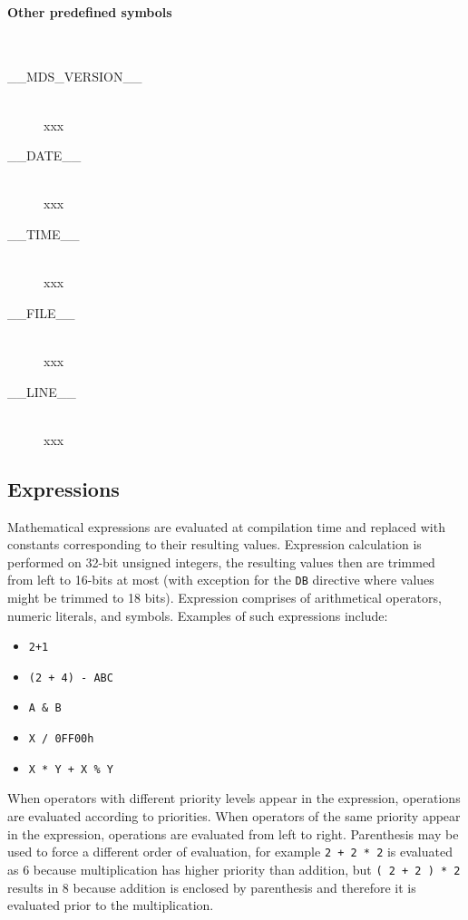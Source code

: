             \paragraph{Other predefined symbols}~\\
                \begin{description}
                    \item[\_\_MDS\_VERSION\_\_]~\\ xxx
                    \item[\_\_DATE\_\_]~\\ xxx
                    \item[\_\_TIME\_\_]~\\ xxx
                    \item[\_\_FILE\_\_]~\\ xxx
                    \item[\_\_LINE\_\_]~\\ xxx
                \end{description}

    \subsection{Expressions}
        Mathematical expressions are evaluated at compilation time and replaced with constants corresponding to their resulting values. Expression calculation is performed on 32-bit unsigned integers, the resulting values then are trimmed from left to 16-bits at most (with exception for the \texttt{DB} directive where values might be trimmed to 18 bits). Expression comprises of arithmetical operators, numeric literals, and symbols. Examples of such expressions include:

        \begin{itemize}
            \item \texttt{2+1}
            \item \texttt{(2 + 4) - ABC}
            \item \texttt{A \& B}
            \item \texttt{X / 0FF00h}
            \item \texttt{X * Y + X \% Y}
        \end{itemize}

        When operators with different priority levels appear in the expression, operations are evaluated according to priorities. When operators of the same priority appear in the expression, operations are evaluated from left to right. Parenthesis may be used to force a different order of evaluation, for example \texttt{2 + 2 * 2} is evaluated as 6 because multiplication has higher priority than addition, but \texttt{( 2 + 2 ) * 2} results in 8 because addition is enclosed by parenthesis and therefore it is evaluated prior to the multiplication.


